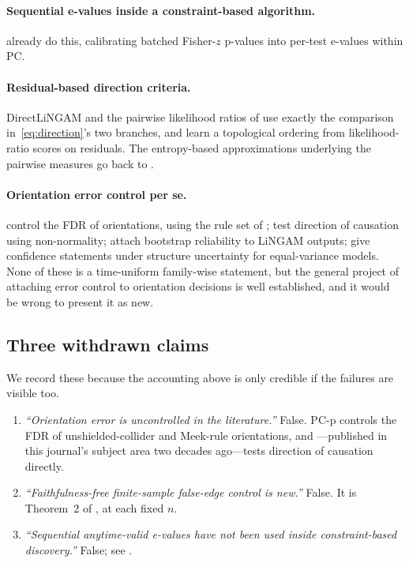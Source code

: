 \paragraph{Sequential e-values inside a constraint-based algorithm.}
\citet{csillag2025prediction} already do this, calibrating batched Fisher-$z$
p-values into per-test e-values within PC.

\paragraph{Residual-based direction criteria.} DirectLiNGAM
\citep{shimizu2011directlingam} and the pairwise likelihood ratios of
\citet{hyvarinen2013pairwise} use exactly the comparison
in~\eqref{eq:direction}'s two branches, and \citet{ruiz2022sequentially} learn
a topological ordering from likelihood-ratio scores on residuals. The
entropy-based approximations underlying the pairwise measures go back to
\citet{hyvarinen1998new}.

\paragraph{Orientation error control per se.} \citet{strobl2019estimating}
control the FDR of orientations, using the rule set of
\citet{meek1995causal}; \citet{shimizu2008use} test direction of
causation using non-normality; \citet{komatsu2010assessing} attach bootstrap
reliability to LiNGAM outputs; \citet{strieder2023confidence} give confidence
statements under structure uncertainty for equal-variance models. None of
these is a time-uniform family-wise statement, but the general project of
attaching error control to orientation decisions is well established, and it
would be wrong to present it as new.

\subsection{Three withdrawn claims}\label{sec:withdrawn}

We record these because the accounting above is only credible if the failures
are visible too.

\begin{enumerate}
\item \emph{``Orientation error is uncontrolled in the literature.''} False.
  PC-p \citep{strobl2019estimating} controls the FDR of unshielded-collider
  and Meek-rule orientations, and \citet{shimizu2008use}---published in this
  journal's subject area two decades ago---tests direction of causation
  directly.
\item \emph{``Faithfulness-free finite-sample false-edge control is new.''}
  False. It is Theorem~2 of \citet{shaska2025causal}, at each fixed $n$.
\item \emph{``Sequential anytime-valid e-values have not been used inside
  constraint-based discovery.''} False;
  see \citet{csillag2025prediction}.
\end{enumerate}

